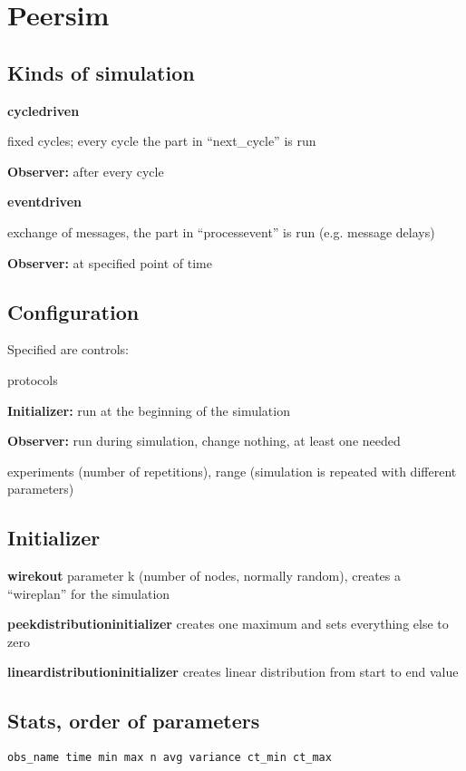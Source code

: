\chapter{Peersim}
\section{Kinds of simulation}
\textbf{cycledriven}\\
\begin{compactitem}
    \item fixed cycles; every cycle the part in ``next\_cycle'' is run
    \item \textbf{Observer:} after every cycle
\end{compactitem}

\textbf{eventdriven}\\
\begin{compactitem}
    \item exchange of messages, the part in ``processevent'' is run (e.g. message delays)
    \item \textbf{Observer:} at specified point of time
\end{compactitem}

\section{Configuration}
Specified are controls:\\
\begin{compactitem}
    \item protocols
    \item \textbf{Initializer:} run at the beginning of the simulation
    \item \textbf{Observer:} run during simulation, change nothing, at least one needed
\end{compactitem}

experiments (number of repetitions), range (simulation is repeated with different parameters)
\section{Initializer}
\begin{compactitem}
    \item \textbf{wirekout} parameter k (number of nodes, normally random), creates a ``wireplan'' for the simulation
    \item \textbf{peekdistributioninitializer} creates one maximum and sets everything else to zero
    \item \textbf{lineardistributioninitializer} creates linear distribution from start to end value
\end{compactitem}

\section{Stats, order of parameters}
\texttt{obs\_name time min max n avg variance ct\_min ct\_max}
